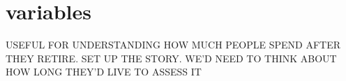 

% 
\section{variables}

USEFUL FOR UNDERSTANDING HOW MUCH PEOPLE SPEND AFTER THEY RETIRE. SET UP THE STORY. WE'D NEED TO THINK ABOUT HOW LONG THEY'D LIVE TO ASSESS IT

